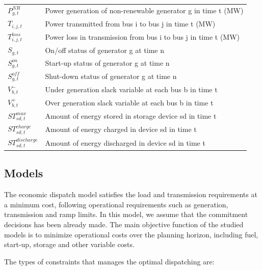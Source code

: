 \documentclass[12pt,LUDisStyle,twosided]{book}
\begin{document}
\begin{tabular}{ll}

$P^{NR}_{g,t} $& Power generation of non-renewable generator g in time t (MW)\\
$T_{i,j,t} $& Power transmitted from bus i to bus j in time t (MW)\\
$T^{loss}_{i,j,t} $& Power loss in transmission from bus i to bus j in time t (MW)\\
$S_{g,t} $& On/off status of generator g at time n\\
$S^{on}_{g,t} $& Start-up status of generator g at time n\\
$S^{off}_{g,t} $& Shut-down status of generator g at time n\\
$V^{-}_{b,t} $& Under generation slack variable at each bus b in time t\\
$V^{+}_{b,t} $& Over generation slack variable at each bus b in time t\\
$ST^{max}_{sd,t} $& Amount of energy stored in storage device sd in time t\\
$ST^{charge}_{sd,t} $& Amount of energy charged in device sd in time t\\
$ST^{discharge}_{sd,t} $& Amount of energy discharged in device sd in time t\\

\end{tabular}

\subsection{Models}

The economic dispatch model satisfies the load and transmission requirements at a minimum cost, following operational requirements such as generation, transmission and ramp limits. In this model, we assume that the commitment decisions has been already made. The main objective function of the studied models is to minimize operational costs over the planning horizon, including fuel, start-up, storage and other variable costs.

The types of constraints that manages the optimal dispatching are:
\end{document}
